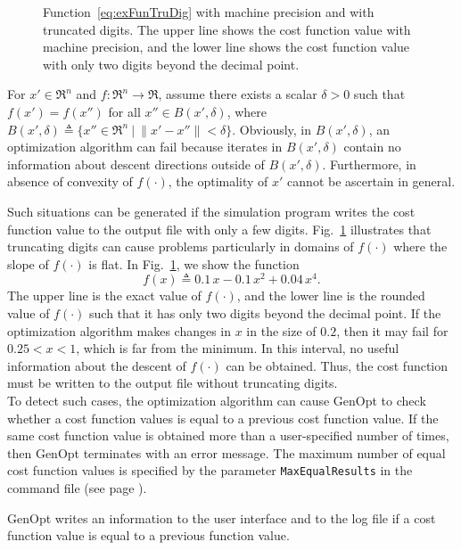 \begin{figure}[ht!]
  \centering
  \resizebox{\textwidth}{!}{%
  }
  \caption{Function~\eqref{eq:exFunTruDig} with machine precision and
with truncated digits.
The upper line shows the cost function value with machine precision, and
the lower line shows the cost function value with only 
two digits beyond the decimal point.}
  \label{fig:truSigDig}
\end{figure}
For $x' \in \Re^n$ and $f \colon \Re^n \to \Re$, assume there exists a
scalar $\delta > 0$ such that $f(x') = f(x'')$ for all 
$x'' \in B(x', \delta)$, where 
$B(x', \delta) \triangleq \{ x'' \in \Re^n \ | \
\| x' - x'' \| < \delta \}$.
Obviously, in $B(x', \delta)$, an optimization algorithm can fail
because iterates in $B(x', \delta)$ contain no information about
descent directions outside of $B(x', \delta)$.
Furthermore, in absence of convexity of $f(\cdot)$, the optimality of
$x'$ cannot be ascertain in general.

Such situations can be generated if the simulation program
writes the cost function value to the output file 
with only a few digits.
Fig.~\ref{fig:truSigDig} illustrates that truncating digits can cause 
problems particularly in domains of $f(\cdot)$ where the slope of $f(\cdot)$
is flat.
In Fig.~\ref{fig:truSigDig}, we show the function
\begin{equation}
  f(x) \triangleq 0.1 \, x - 0.1 \, x^2 + 0.04 \, x^4.
\label{eq:exFunTruDig}
\end{equation}
The upper line is the exact value of $f(\cdot)$, and the lower line is 
the rounded value of $f(\cdot)$ such that it has only two digits 
beyond the decimal point.
If the optimization algorithm makes changes in $x$ in the size of $0.2$,
then it may fail for $0.25 < x < 1$, which is far from the minimum.
In this interval, no useful information about the descent of $f(\cdot)$ 
can be obtained.
Thus, the cost function must be written to the output file without truncating digits.\\

To detect such cases, the optimization algorithm can cause GenOpt to check 
whether a cost function values is equal to a previous cost function value.
If the same cost function value is obtained more than a user-specified number
of times, 
then GenOpt terminates with an error message. 
The maximum number of equal cost function values is specified 
by the parameter \texttt{MaxEqualResults} in the command file (see page \pageref{par:comFil}).

GenOpt writes an information to the user interface and to the log file if
a cost function value is equal to a previous function value.
